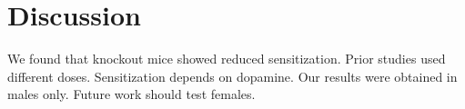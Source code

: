 \documentclass{article}
\begin{document}
\section*{Discussion}
We found that knockout mice showed reduced sensitization. Prior studies used different doses. Sensitization depends on dopamine. Our results were obtained in males only. Future work should test females.
\end{document}
